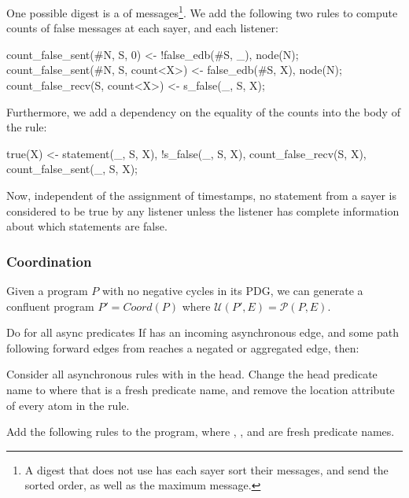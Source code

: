
One possible digest is a  of  messages\footnote{A digest that does not use  has each sayer sort their messages, and send the sorted order, as well as the maximum message.}.  We add the following two rules to compute counts of false messages at each sayer, and each listener:

\begin{Dedalus}
count_false_sent(#N, S, 0) <- !false_edb(#S, _), node(N);
count_false_sent(#N, S, count<X>) <- false_edb(#S, X),
                                     node(N);
count_false_recv(S, count<X>) <- s_false(_, S, X);
\end{Dedalus}

Furthermore, we add a dependency on the equality of the counts into the body of the  rule:

\begin{Dedalus}
true(X) <- statement(_, S, X), !s_false(_, S, X),
           count_false_recv(S, X),
           count_false_sent(_, S, X);
\end{Dedalus}

Now, independent of the assignment of timestamps, no statement from a sayer  is considered to be true by any listener unless the listener has complete information about which statements are false.

\subsubsection{Coordination}
Given a \lang program $P$ with no negative cycles in its PDG, we can generate a confluent program $P' = Coord(P)$ where $\mathcal{U}(P', E) = \mathcal{P}(P, E)$.

Do for all async predicates 
If  has an incoming asynchronous edge, and some path following forward edges from  reaches a negated or aggregated edge, then:

Consider all asynchronous rules with  in the head.  Change the head predicate name to  where that is a fresh predicate name, and remove the location attribute of every atom in the rule.

Add the following rules to the program, where , , and  are fresh predicate names.

